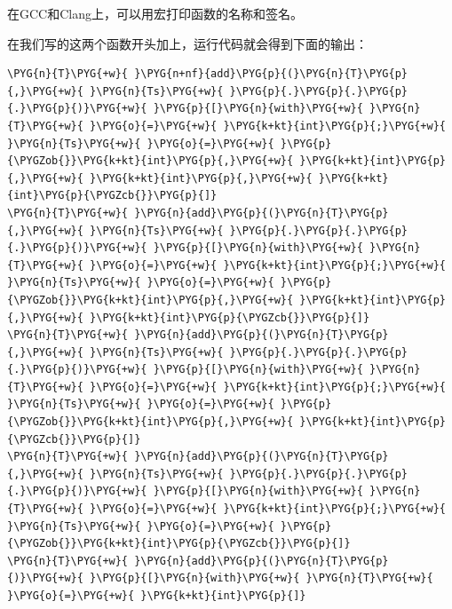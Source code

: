 
\begin{myNote}[tip]
在GCC和Clang上，可以用宏打印函数的名称和签名。
\end{myNote}



在我们写的这两个函数开头加上，运行代码就会得到下面的输出：



\begin{codeblockbg}
\begin{Verbatim}[commandchars=\\\{\},breaklines=true,breakanywhere=true,fontsize=\codefont,xleftmargin=17bp]
\PYG{n}{T}\PYG{+w}{ }\PYG{n+nf}{add}\PYG{p}{(}\PYG{n}{T}\PYG{p}{,}\PYG{+w}{ }\PYG{n}{Ts}\PYG{+w}{ }\PYG{p}{.}\PYG{p}{.}\PYG{p}{.}\PYG{p}{)}\PYG{+w}{ }\PYG{p}{[}\PYG{n}{with}\PYG{+w}{ }\PYG{n}{T}\PYG{+w}{ }\PYG{o}{=}\PYG{+w}{ }\PYG{k+kt}{int}\PYG{p}{;}\PYG{+w}{ }\PYG{n}{Ts}\PYG{+w}{ }\PYG{o}{=}\PYG{+w}{ }\PYG{p}{\PYGZob{}}\PYG{k+kt}{int}\PYG{p}{,}\PYG{+w}{ }\PYG{k+kt}{int}\PYG{p}{,}\PYG{+w}{ }\PYG{k+kt}{int}\PYG{p}{,}\PYG{+w}{ }\PYG{k+kt}{int}\PYG{p}{\PYGZcb{}}\PYG{p}{]}
\PYG{n}{T}\PYG{+w}{ }\PYG{n}{add}\PYG{p}{(}\PYG{n}{T}\PYG{p}{,}\PYG{+w}{ }\PYG{n}{Ts}\PYG{+w}{ }\PYG{p}{.}\PYG{p}{.}\PYG{p}{.}\PYG{p}{)}\PYG{+w}{ }\PYG{p}{[}\PYG{n}{with}\PYG{+w}{ }\PYG{n}{T}\PYG{+w}{ }\PYG{o}{=}\PYG{+w}{ }\PYG{k+kt}{int}\PYG{p}{;}\PYG{+w}{ }\PYG{n}{Ts}\PYG{+w}{ }\PYG{o}{=}\PYG{+w}{ }\PYG{p}{\PYGZob{}}\PYG{k+kt}{int}\PYG{p}{,}\PYG{+w}{ }\PYG{k+kt}{int}\PYG{p}{,}\PYG{+w}{ }\PYG{k+kt}{int}\PYG{p}{\PYGZcb{}}\PYG{p}{]}
\PYG{n}{T}\PYG{+w}{ }\PYG{n}{add}\PYG{p}{(}\PYG{n}{T}\PYG{p}{,}\PYG{+w}{ }\PYG{n}{Ts}\PYG{+w}{ }\PYG{p}{.}\PYG{p}{.}\PYG{p}{.}\PYG{p}{)}\PYG{+w}{ }\PYG{p}{[}\PYG{n}{with}\PYG{+w}{ }\PYG{n}{T}\PYG{+w}{ }\PYG{o}{=}\PYG{+w}{ }\PYG{k+kt}{int}\PYG{p}{;}\PYG{+w}{ }\PYG{n}{Ts}\PYG{+w}{ }\PYG{o}{=}\PYG{+w}{ }\PYG{p}{\PYGZob{}}\PYG{k+kt}{int}\PYG{p}{,}\PYG{+w}{ }\PYG{k+kt}{int}\PYG{p}{\PYGZcb{}}\PYG{p}{]}
\PYG{n}{T}\PYG{+w}{ }\PYG{n}{add}\PYG{p}{(}\PYG{n}{T}\PYG{p}{,}\PYG{+w}{ }\PYG{n}{Ts}\PYG{+w}{ }\PYG{p}{.}\PYG{p}{.}\PYG{p}{.}\PYG{p}{)}\PYG{+w}{ }\PYG{p}{[}\PYG{n}{with}\PYG{+w}{ }\PYG{n}{T}\PYG{+w}{ }\PYG{o}{=}\PYG{+w}{ }\PYG{k+kt}{int}\PYG{p}{;}\PYG{+w}{ }\PYG{n}{Ts}\PYG{+w}{ }\PYG{o}{=}\PYG{+w}{ }\PYG{p}{\PYGZob{}}\PYG{k+kt}{int}\PYG{p}{\PYGZcb{}}\PYG{p}{]}
\PYG{n}{T}\PYG{+w}{ }\PYG{n}{add}\PYG{p}{(}\PYG{n}{T}\PYG{p}{)}\PYG{+w}{ }\PYG{p}{[}\PYG{n}{with}\PYG{+w}{ }\PYG{n}{T}\PYG{+w}{ }\PYG{o}{=}\PYG{+w}{ }\PYG{k+kt}{int}\PYG{p}{]}
\end{Verbatim}
\end{codeblockbg}


